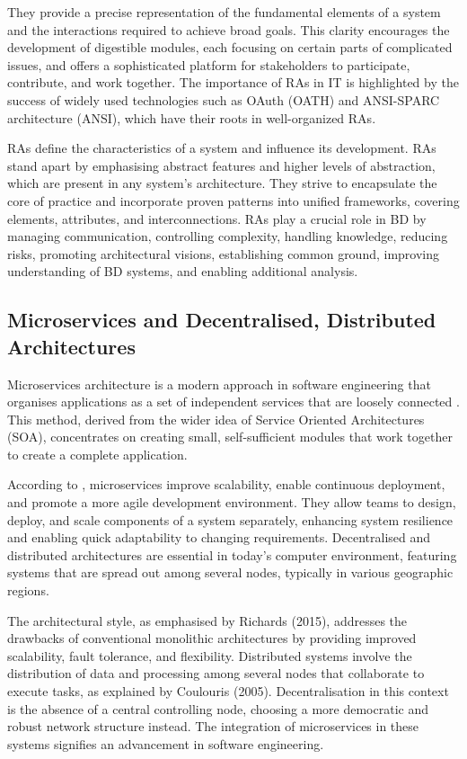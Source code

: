 \documentclass[preprint,12pt]{elsarticle}
\begin{document}
They provide a precise representation of the fundamental elements of a system and the interactions required to achieve broad goals. This clarity encourages the development of digestible modules, each focusing on certain parts of complicated issues, and offers a sophisticated platform for stakeholders to participate, contribute, and work together. The importance of RAs in IT is highlighted by the success of widely used technologies such as OAuth (OATH) and ANSI-SPARC architecture (ANSI), which have their roots in well-organized RAs. 

RAs define the characteristics of a system and influence its development. RAs stand apart by emphasising abstract features and higher levels of abstraction, which are present in any system's architecture. They strive to encapsulate the core of practice and incorporate proven patterns into unified frameworks, covering elements, attributes, and interconnections. RAs play a crucial role in BD by managing communication, controlling complexity, handling knowledge, reducing risks, promoting architectural visions, establishing common ground, improving understanding of BD systems, and enabling additional analysis. 

\subsection{Microservices and Decentralised, Distributed Architectures} 

Microservices architecture is a modern approach in software engineering that organises applications as a set of independent services that are loosely connected \cite{bucchiarone2020microservices}. This method, derived from the wider idea of Service Oriented Architectures (SOA), concentrates on creating small, self-sufficient modules that work together to create a complete application. 

According to \citeauthor{newman2021building}, microservices improve scalability, enable continuous deployment, and promote a more agile development environment. They allow teams to design, deploy, and scale components of a system separately, enhancing system resilience and enabling quick adaptability to changing requirements. Decentralised and distributed architectures are essential in today's computer environment, featuring systems that are spread out among several nodes, typically in various geographic regions. 


The architectural style, as emphasised by Richards (2015), addresses the drawbacks of conventional monolithic architectures by providing improved scalability, fault tolerance, and flexibility. Distributed systems involve the distribution of data and processing among several nodes that collaborate to execute tasks, as explained by Coulouris (2005). Decentralisation in this context is the absence of a central controlling node, choosing a more democratic and robust network structure instead. The integration of microservices in these systems signifies an advancement in software engineering. 
\end{document}
